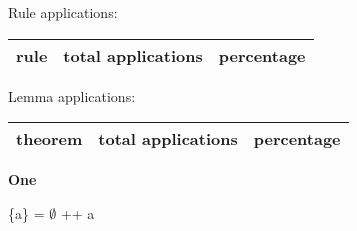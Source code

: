 \documentclass[a4paper]{article}
\begin{document}
Rule applications:

\begin{supertabular}{l|r|r}
rule	        & total applications & percentage \\ \hline

\end{supertabular}

Lemma applications:

\begin{supertabular}{l|r|r}
theorem	        & total applications & percentage \\ \hline

\end{supertabular}
\pagebreak

{\LARGE\bf One}\label{lemma-One}

\medskip

 \Fol \{a\} = $\emptyset$ ++ a
\end{document}
